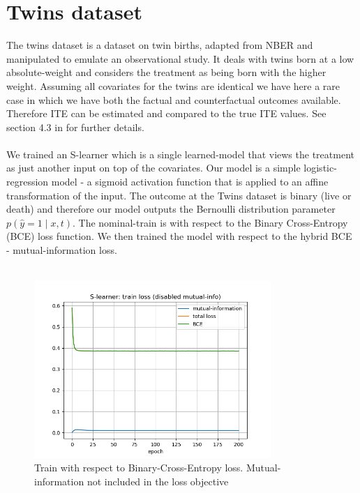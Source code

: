 \documentclass[oneside,12pt]{article}
\begin{document}
\section*{Twins dataset}
%
The twins dataset is a dataset on twin births, adapted from NBER and manipulated to emulate an observational study. It deals with twins born at a low absolute-weight and considers the treatment as being born with the higher weight. Assuming all covariates for the twins are identical we have here a rare case in which we have both the factual and counterfactual outcomes available. Therefore ITE can be estimated and compared to the true ITE values. See section 4.3 in \cite{NIPS2017_7223} for further details.\\\\
%
We trained an S-learner \cite{Knzel4156} which is a single learned-model that views the treatment as just another input on top of the covariates. Our model is a simple logistic-regression model - a sigmoid activation function that is applied to an affine transformation of the input. The outcome at the Twins dataset is binary (live or death) and therefore our model outputs the Bernoulli distribution parameter $p(\hat{y}=1 \mid x,t)$. The nominal-train is with respect to the Binary Cross-Entropy (BCE) loss function. We then trained the model with respect to the hybrid BCE - mutual-information loss.\\\\
%
\begin{figure}
    \centering
        \includegraphics[width=0.8\textwidth]{./train_loss_disableMi}
        \caption{\label{fig:train_loss_disableMi}Train with respect to Binary-Cross-Entropy loss. Mutual-information not included in the loss objective}
\end{figure}
%
\end{document}
